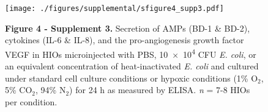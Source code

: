 \documentclass[9pt,lineo]{elife}
\date{\today}
\title{}
\begin{document}
\begin{figure}
\begin{fullwidth}
\centering\texttt{[image: ./figures/supplemental/sfigure4\_supp3.pdf]}
\caption*{\textbf{Figure 4 - Supplement 3. } Secretion of AMPs (BD-1 \& BD-2), cytokines (IL-6 \& IL-8), and the pro-angiogenesis growth factor VEGF in HIOs microinjected with PBS, \num{10e4} CFU \textit{E. coli}, or an equivalent concentration of heat-inactivated \textit{E. coli} and cultured under standard cell culture conditions or hypoxic conditions (1\% O$_{2}$, 5\% CO$_{2}$, 94\% N$_{2}$) for 24 h as measured by ELISA. \textit{n} = 7-8 HIOs per condition.}
\label{fig:fullwidth}
\end{fullwidth}
\end{figure}
\end{document}
